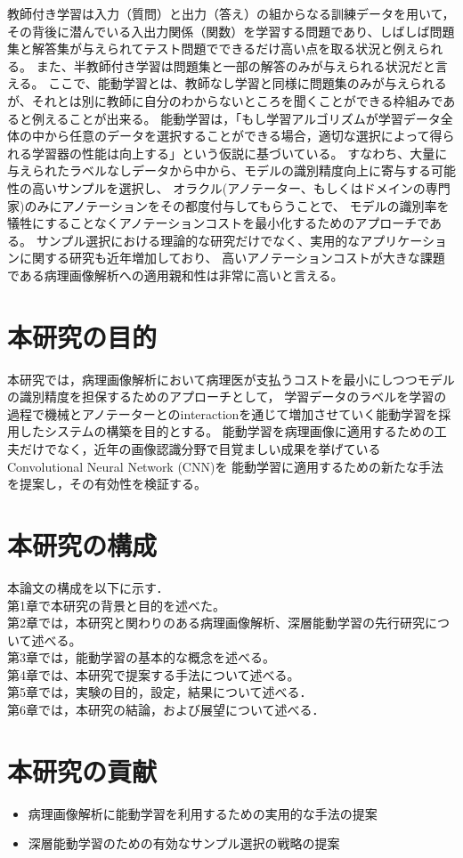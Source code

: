 教師付き学習は入力（質問）と出力（答え）の組からなる訓練データを用いて， その背後に潜んでいる入出力関係（関数）を学習する問題であり、しばしば問題集と解答集が与えられてテスト問題でできるだけ高い点を取る状況と例えられる。
また、半教師付き学習は問題集と一部の解答のみが与えられる状況だと言える。
ここで、能動学習とは、教師なし学習と同様に問題集のみが与えられるが、それとは別に教師に自分のわからないところを聞くことができる枠組みであると例えることが出来る。
能動学習は，「もし学習アルゴリズムが学習データ全体の中から任意のデータを選択することができる場合，適切な選択によって得られる学習器の性能は向上する」という仮説に基づいている。
すなわち、大量に与えられたラベルなしデータから中から、モデルの識別精度向上に寄与する可能性の高いサンプルを選択し、
オラクル(アノテーター、もしくはドメインの専門家)のみにアノテーションをその都度付与してもらうことで、
モデルの識別率を犠牲にすることなくアノテーションコストを最小化するためのアプローチである。
サンプル選択における理論的な研究だけでなく、実用的なアプリケーションに関する研究も近年増加しており、
高いアノテーションコストが大きな課題である病理画像解析への適用親和性は非常に高いと言える。


\section{本研究の目的}
本研究では，病理画像解析において病理医が支払うコストを最小にしつつモデルの識別精度を担保するためのアプローチとして，
学習データのラベルを学習の過程で機械とアノテーターとのinteractionを通じて増加させていく能動学習を採用したシステムの構築を目的とする。
能動学習を病理画像に適用するための工夫だけでなく，近年の画像認識分野で目覚ましい成果を挙げているConvolutional Neural Network (CNN)を
能動学習に適用するための新たな手法を提案し，その有効性を検証する。


\section{本研究の構成}
本論文の構成を以下に示す．\\
第1章で本研究の背景と目的を述べた。 \\
第2章では，本研究と関わりのある病理画像解析、深層能動学習の先行研究について述べる。\\
第3章では，能動学習の基本的な概念を述べる。\\
第4章では、本研究で提案する手法について述べる。\\
第5章では，実験の目的，設定，結果について述べる．\\
第6章では，本研究の結論，および展望について述べる．

\section{本研究の貢献}
\begin{itemize}
    \item 病理画像解析に能動学習を利用するための実用的な手法の提案
    \item 深層能動学習のための有効なサンプル選択の戦略の提案
\end{itemize}